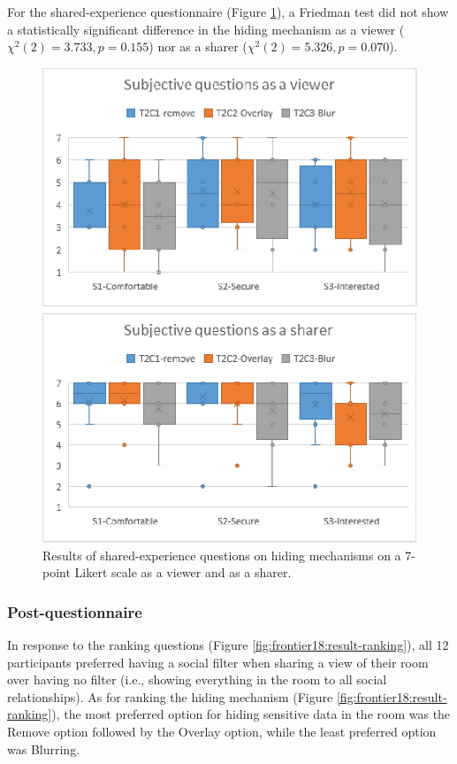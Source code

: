 For the shared-experience questionnaire (Figure \ref{fig:frontier18:result-shared-experience-questions-hiding}), a Friedman test did not show a statistically significant difference in the hiding mechanism as a viewer ($\chi^2(2)=3.733, p=0.155$) nor as a sharer ($\chi^2(2)=5.326, p=0.070$).

\begin{figure}
    \begin{center}
    \includegraphics[width=.8\linewidth]{images/54-hiding-frontier18/images-15.eps}
    \caption{Results of shared-experience questions on hiding mechanisms on a 7-point Likert scale as a viewer and as a sharer.}
    \label{fig:frontier18:result-shared-experience-questions-hiding}
    \end{center}
\end{figure}

\subsubsection{Post-questionnaire}

In response to the ranking questions (Figure \ref{fig:frontier18:result-ranking}), all 12 participants preferred having a social filter when sharing a view of their room over having no filter (i.e., showing everything in the room to all social relationships). As for ranking the hiding mechanism (Figure \ref{fig:frontier18:result-ranking}), the most preferred option for hiding sensitive data in the room was the Remove option followed by the Overlay option, while the least preferred option was Blurring. 

